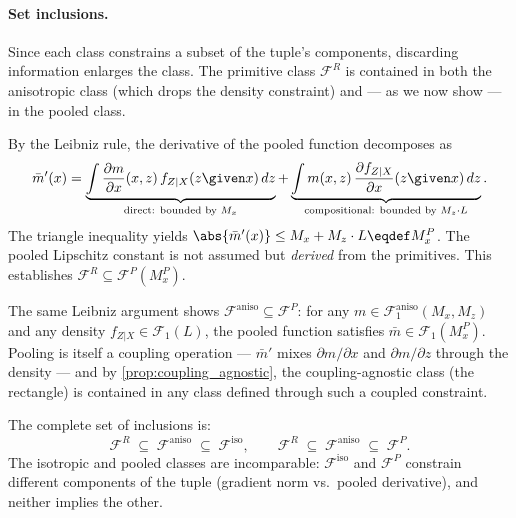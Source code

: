 \paragraph{Set inclusions.}
Since each class constrains a subset of the tuple's components, discarding information enlarges the class.
The primitive class $\mathcal{F}^R$ is contained in both the anisotropic class (which drops the density constraint) and --- as we now show --- in the pooled class.

By the Leibniz rule, the derivative of the pooled function decomposes as
\begin{equation*}
	\bar{m}'(x) = \underbrace{\int \frac{\partial m}{\partial x}(x,z)\, f_{Z|X}(z \given x)\, dz}_{\text{direct: bounded by } M_x} + \underbrace{\int m(x,z)\, \frac{\partial f_{Z|X}}{\partial x}(z \given x)\, dz}_{\text{compositional: bounded by } M_z \cdot L}.
\end{equation*}
The triangle inequality yields $\abs{\bar{m}'(x)} \leq M_x + M_z \cdot L \eqdef M_x^P$.
The pooled Lipschitz constant is not assumed but \emph{derived} from the primitives.
This establishes $\mathcal{F}^R \subseteq \mathcal{F}^P(M_x^P)$.

The same Leibniz argument shows $\mathcal{F}^{\mathrm{aniso}} \subseteq \mathcal{F}^P$: for any $m \in \mathcal{F}_1^{\mathrm{aniso}}(M_x, M_z)$ and any density $f_{Z|X} \in \mathcal{F}_1(L)$, the pooled function satisfies $\bar{m} \in \mathcal{F}_1(M_x^P)$.
Pooling is itself a coupling operation --- $\bar{m}'$ mixes $\partial m / \partial x$ and $\partial m / \partial z$ through the density --- and by \cref{prop:coupling_agnostic}, the coupling-agnostic class (the rectangle) is contained in any class defined through such a coupled constraint.

The complete set of inclusions is:
\begin{equation*}
	\mathcal{F}^R \;\subseteq\; \mathcal{F}^{\mathrm{aniso}} \;\subseteq\; \mathcal{F}^{\mathrm{iso}}, \qquad
	\mathcal{F}^R \;\subseteq\; \mathcal{F}^{\mathrm{aniso}} \;\subseteq\; \mathcal{F}^P.
\end{equation*}
The isotropic and pooled classes are incomparable: $\mathcal{F}^{\mathrm{iso}}$ and $\mathcal{F}^P$ constrain different components of the tuple (gradient norm vs.\ pooled derivative), and neither implies the other.


